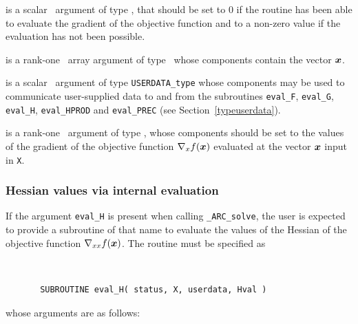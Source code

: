 \documentclass{galahad}
\newcommand{\packagename}{ARC}
\newcommand{\fullpackagename}{\libraryname\_\packagename}
\newcommand{\solver}{{\tt \fullpackagename\_solve}}
\begin{document}
\begin{description}
 is a scalar \intentout\ argument of type \integer,
that should be set to 0 if the routine has been able to evaluate
the gradient of the objective function
and to a non-zero value if the evaluation has not been possible.

 is a rank-one \intentin\ array argument of type \realdp\
whose components contain the vector ${\bm{x}}$.

 is a scalar \intentinout\ argument of type
{\tt USERDATA\_type} whose components may be used
to communicate user-supplied data to and from the
subroutines {\tt eval\_F}, {\tt eval\_G},
{\tt eval\_H}, {\tt eval\_HPROD} and {\tt eval\_PREC}
(see Section~\ref{typeuserdata}).

 is a rank-one \intentout\ argument of type \realdp,
whose components should be set to the values of the gradient
of the objective function $\nabla_x f({\bm{x}})$
evaluated at the vector ${\bm{x}}$ input in {\tt X}.

\end{description}


\subsubsection{Hessian values via internal evaluation\label{hfv}}

If the argument {\tt eval\_H} is present when calling \solver, the
user is expected to provide a subroutine of that name to evaluate the
values of the Hessian of the objective function $\nabla_{xx} f({\bm{x}})$.
The routine must be specified as

\def\baselinestretch{0.8}
{\tt
\begin{verbatim}
       SUBROUTINE eval_H( status, X, userdata, Hval )
\end{verbatim} }
\def\baselinestretch{1.0}
\noindent whose arguments are as follows:
\end{document}
